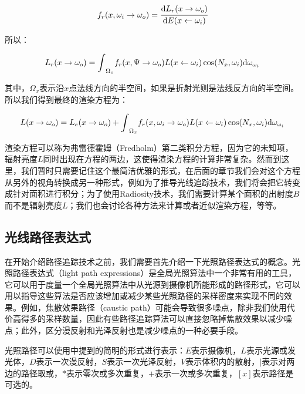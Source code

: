 \begin{equation}
	f_r(x,\omega_i\to\omega_o)= \cfrac{{\rm d}L_r(x\to\omega_o)}{{\rm d}E(x\leftarrow\omega_i)}
\end{equation}

\noindent 所以：

\begin{equation}
	L_r(x\to\omega_o)={\rm \int}_{\Omega_x} f_r(x,\Psi\to\omega_o)L(x\leftarrow\omega_i)\cos(N_x,\omega_i){\rm d}\omega_{\omega_i}
\end{equation}

\noindent 其中，$\Omega_x$表示沿$x$点法线方向的半空间，如果是折射光则是法线反方向的半空间。所以我们得到最终的渲染方程为：

\begin{equation}
	L(x\to\omega_o)=L_e(x\to\omega_o)+{\rm \int}_{\Omega_x} f_r(x,\omega_i\to\omega_o)L(x\leftarrow\omega_i)\cos(N_x,\omega_i){\rm d}\omega_{\omega_i}
\end{equation}

渲染方程可以称为弗雷德霍姆（Fredholm）第二类积分方程，因为它的未知项，辐射亮度$L$同时出现在方程的两边，这使得渲染方程的计算非常复杂。然而到这里，我们暂时只需要记住这个最简洁优雅的形式，在后面的章节我们会对这个方程从另外的视角转换成另一种形式，例如为了推导光线追踪技术，我们将会把它转变成针对面积进行积分；为了使用Radiosity技术，我们需要计算某个面积的出射度$B$而不是辐射亮度$L$；我们也会讨论各种方法来计算或者近似渲染方程，等等。



\subsection{光线路径表达式}
在开始介绍路径追踪技术之前，我们需要首先介绍一下光照路径表达式的概念。光照路径表达式（light path expressions）是全局光照算法中一个非常有用的工具，它可以用于度量一个全局光照算法中从光源到摄像机所能形成的路径形式，它可以用以指导这些算法是否应该增加或减少某些光照路径的采样密度来实现不同的效果。例如，焦散效果路径（caustic path）可能会导致很多噪点，除非我们使用代价高得多的采样数量，因此有些路径追踪算法可以直接忽略掉焦散效果以减少噪点；此外，区分漫反射和光泽反射也是减少噪点的一种必要手段。

光照路径可以使用\cite{a:Adaptiveradiositytexturesforbidirectionalraytracing}中提到的简明的形式进行表示：$E$表示摄像机，$L$表示光源或发光体，$D$表示一次漫反射，$S$表示一次光泽反射，$V$表示体积内的散射，$|$表示对两边的路径取或，$*$表示零次或多次重复，$+$表示一次或多次重复，$[x]$表示路径是可选的。

